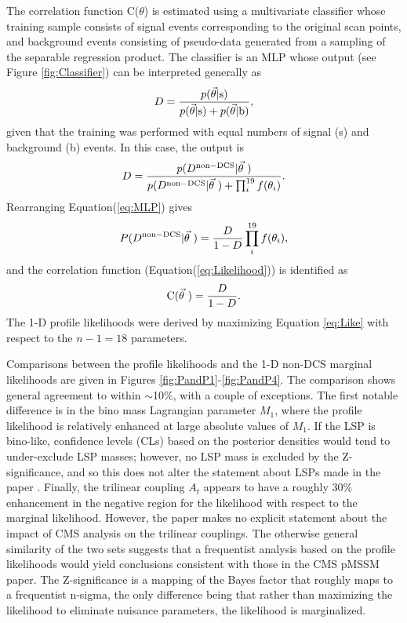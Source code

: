 The correlation function C($\theta$) is estimated using a multivariate classifier whose training sample consists of signal events corresponding to the original scan points, and background events consisting of pseudo-data generated from a sampling of the separable regression product. The classifier is an MLP whose output (see Figure \ref{fig:Classifier}) can be interpreted generally as
\begin{equation}
D = \frac{p(\vec{\theta} | {\rm s})}{p(\vec{\theta} | {\rm s})+p(\vec{\theta} | {\rm b})},
\label{eq:mlp}
\end{equation}
given that the training was performed with equal numbers of signal (s) and background (b) events. In this case, the output is
\begin{equation}
D = \frac{p(D^{\rm non-DCS}|\vec{\theta}\ )}{p(D^{\rm non-DCS}|\vec{\theta}\ )+ \prod_{i}^{19}f(\theta_{i})}.
\label{eq:MLP}
\end{equation}
Rearranging Equation(\ref{eq:MLP}) gives
\begin{equation}
P(D^{\rm non-DCS}|\vec{\theta}\ ) = \frac{D}{1-D}\prod_{i}^{19}f(\theta_{i}),
\label{eq:Like}
\end{equation}
and the correlation function (Equation(\ref{eq:Likelihood})) is identified as
\begin{equation}
{\rm C}(\vec{\theta}\ ) = \frac{D}{1-D}.
\end{equation}
The 1-D profile likelihoods were derived by maximizing Equation \ref{eq:Like} with respect to the $n-1=18$ parameters. 

Comparisons between the profile likelihoods and the 1-D non-DCS  marginal likelihoods are given in Figures \ref{fig:PandP1}-\ref{fig:PandP4}.  The comparison shows general agreement to within $\sim$10\%, with a couple of exceptions. The first notable difference is in the bino mass Lagrangian parameter $M_1$, where the profile likelihood is relatively enhanced at large absolute values of $M_1$. If the LSP is bino-like,  confidence levels (CLs) based on the posterior densities would tend to under-exclude LSP masses; however, no LSP mass is excluded by the Z-significance, and so this does not alter the statement about LSPs made in the paper \cite{Khachatryan:2016nvf}. Finally, the trilinear coupling $A_t$ appears to have a roughly 30\% enhancement in the negative region for the likelihood with respect to the marginal likelihood. However, the paper makes no explicit statement about the impact of CMS analysis on the trilinear couplings. The otherwise general similarity of the two sets suggests that a frequentist analysis based on the profile likelihoods would yield conclusions consistent with those in the CMS pMSSM paper.  The Z-significance is a mapping of the Bayes factor that roughly maps to a frequentist n-sigma, the only difference being that rather than maximizing the likelihood to eliminate nuisance parameters, the likelihood is marginalized. 

